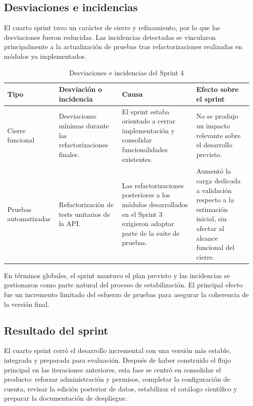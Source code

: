 \subsection{Desviaciones e incidencias}

El cuarto sprint tuvo un carácter de cierre y refinamiento, por lo que las
desviaciones fueron reducidas. Las incidencias detectadas se vincularon
principalmente a la actualización de pruebas tras refactorizaciones realizadas
en módulos ya implementados.

\begin{table}[H]
\centering
\caption{Desviaciones e incidencias del Sprint 4}
\label{tab:desviaciones_sprint4}
\small
\setlength{\tabcolsep}{4pt}
\renewcommand{\arraystretch}{1.22}
\begin{tabularx}{\textwidth}{|>{\raggedright\arraybackslash}p{2.6cm}|>{\raggedright\arraybackslash}X|>{\raggedright\arraybackslash}X|>{\raggedright\arraybackslash}X|}
\hline
\textbf{Tipo} & \textbf{Desviación o incidencia} & \textbf{Causa} & \textbf{Efecto sobre el sprint} \\
\hline
Cierre funcional & Desviaciones mínimas durante las refactorizaciones finales. & El sprint estaba orientado a cerrar implementación y consolidar funcionalidades existentes. & No se produjo un impacto relevante sobre el desarrollo previsto. \\
\hline
Pruebas automatizadas & Refactorización de tests unitarios de la API. & Las refactorizaciones posteriores a los módulos desarrollados en el Sprint 3 exigieron adaptar parte de la suite de pruebas. & Aumentó la carga dedicada a validación respecto a la estimación inicial, sin afectar al alcance funcional del cierre. \\
\hline
\end{tabularx}
\end{table}

En términos globales, el sprint mantuvo el plan previsto y las incidencias se
gestionaron como parte natural del proceso de estabilización. El principal
efecto fue un incremento limitado del esfuerzo de pruebas para asegurar la
coherencia de la versión final.

\subsection{Resultado del sprint}

El cuarto sprint cerró el desarrollo incremental con una versión más estable, integrada y preparada para evaluación. Después de haber construido el flujo principal en las iteraciones anteriores, esta fase se centró en consolidar el producto: reforzar administración y permisos, completar la configuración de cuenta, revisar la edición posterior de datos, estabilizar el catálogo científico y preparar la documentación de despliegue.

